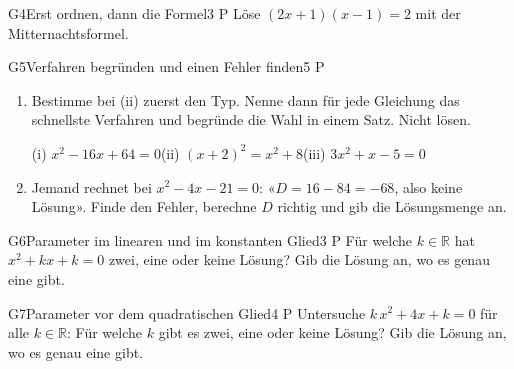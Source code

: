 \documentclass[11pt]{article}
\begin{document}
\begin{lpaufgabe}{G4}{Erst ordnen, dann die Formel}{3 P}
Löse $(2x + 1)(x - 1) = 2$ mit der Mitternachtsformel.
\end{lpaufgabe}

\begin{lpaufgabe}{G5}{Verfahren begründen und einen Fehler finden}{5 P}
\begin{enumerate}[label=(\alph*),leftmargin=*,itemsep=1pt]
\item Bestimme bei (ii) zuerst den Typ. Nenne dann für jede Gleichung das schnellste Verfahren und begründe die Wahl in einem Satz. Nicht lösen.\par
  (i) $x^2 - 16x + 64 = 0$\quad (ii) $(x + 2)^2 = x^2 + 8$\quad (iii) $3x^2 + x - 5 = 0$\par\vspace{5.5\baselineskip}
\item Jemand rechnet bei $x^2 - 4x - 21 = 0$: «$D = 16 - 84 = -68$, also keine Lösung». Finde den Fehler, berechne $D$ richtig und gib die Lösungsmenge an.
\end{enumerate}
\end{lpaufgabe}


\begin{lpaufgabe}{G6}{Parameter im linearen und im konstanten Glied}{3 P}
Für welche $k \in \mathbb{R}$ hat $x^2 + kx + k = 0$ zwei, eine oder keine Lösung? Gib die Lösung an, wo es genau eine gibt.
\end{lpaufgabe}

\begin{lpaufgabe}{G7}{Parameter vor dem quadratischen Glied}{4 P}
Untersuche $k\,x^2 + 4x + k = 0$ für alle $k \in \mathbb{R}$: Für welche $k$ gibt es zwei, eine oder keine Lösung? Gib die Lösung an, wo es genau eine gibt.
\end{lpaufgabe}
\end{document}
